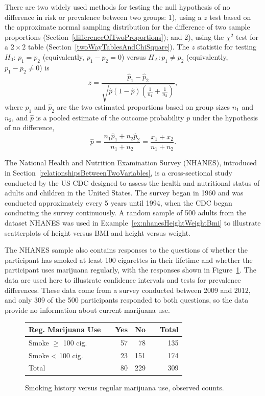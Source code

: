 There are two widely used methods for testing the null hypothesis of no difference in risk or prevalence between two groups: 1), using a $z$ test based on the approximate normal sampling distribution for the difference of two sample proportions (Section~\ref{differenceOfTwoProportions}); and 2), using the $\chi^2$ test for a $2 \times 2$ table (Section~\ref{twoWayTablesAndChiSquare}).   The $z$ statistic for testing $H_0:\, p_1 = p_2$ (equivalently, $p_1 - p_2 = 0$) versus $H_A: p_1 \neq p_2$ (equivalently, $p_1 - p_2 \neq 0$) is
\[z = \dfrac{\hat{p}_1 - \hat{p}_2}{\sqrt{\hat{p}(1-\hat{p})\left(\frac{1}{n_1} + \frac{1}{n_2} \right)}}, \]
where $\hat{p}_1$ and $\hat{p}_2$ are the two estimated proportions based on group sizes $n_1$ and $n_2$, and $\hat{p}$ is a pooled estimate of the outcome probability $p$ under the hypothesis of no difference,
\[\hat{p} = \dfrac{n_{1}\hat{p}_1 + n_{2}\hat{p}_2}{n_{1} + n_{2}} = \dfrac{x_{1} + x_{2}}{n_{1} + n_{2}}. \]

The National Health and Nutrition Examination Survey (NHANES), introduced in Section~\ref{relationshipsBetweenTwoVariables}, is a cross-sectional study conducted by the US CDC designed to assess the health and nutritional status of adults and children in the United States.  The survey began in 1960 and was conducted approximately every 5 years until 1994, when the CDC began conducting the survey continuously. A random sample of 500 adults from the dataset NHANES was used in Example~\ref{ex:nhanesHeightWeightBmi} to illustrate scatterplots of height versus BMI and height versus weight.

The NHANES sample also contains responses to the questions of whether the participant has smoked at least 100 cigarettes in their lifetime and whether the participant uses marijuana regularly, with the responses shown in Figure~\ref{figure:smoke100RegMarijuana}.  The data are used here to illustrate confidence intervals and tests for prevalence differences.  These data come from a survey conducted between 2009 and 2012, and only 309 of the 500 participants responded to both questions, so the data provide no information about current marijuana use.

\begin{figure}[h]
  \centering
  \begin{tabular}{ll rrr r}
    \hline
    Reg. Marijuana Use  & \hspace{2mm} & Yes & No & \hspace{2mm} & Total \\
    \hline
    Smoke $\geq$ 100 cig. & & 57 & 78 &  & 135  \\
    Smoke < 100 cig. & & 23 & 151 &  &  174  \\
        Total & & 80 & 229 & & 309 \\
    \hline
  \end{tabular}
    \caption{Smoking history versus regular marijuana use, observed counts.}
    \label{figure:smoke100RegMarijuana}
\end{figure}

